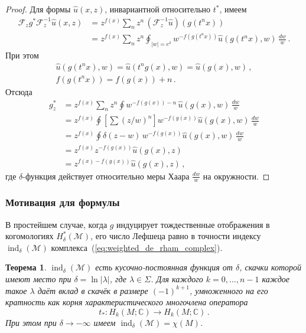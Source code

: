 \documentclass[a4paper, 12pt]{article}
\newtheorem{theorem}{Теорема}[section]
\theoremstyle{definition}
\begin{document}
\begin{proof}
    Для формы $\hat{u}(x,z)$, инвариантной относительно $t^*$, имеем \[
        \begin{aligned}
            \mathcal{F}_z g^* \mathcal{F}_z^{-1} \hat{u} (x,z)
&= z^{f(x)} \sum_{n} z^n \, (\mathcal{F}_z^{-1} \hat{u})(g(t^n x)) \\
&= z^{f(x)} \sum_{n} z^n \oint_{|w|=e^{\delta}} w^{-f(g(t^n x))} \hat{u}(g(t^n x), w) \, \frac{dw}{w}\,.
        \end{aligned}
    \]
    При этом \[
        \begin{gathered}
            \hat{u}(g(t^{n}x), w) = \hat{u}(t^{n}g(x), w) = \hat{u}(g(x), w)\,, \\
            f(g(t^{n}x)) = f(g(x)) + n\,.
        \end{gathered}
    \]
    Отсюда \[
        \begin{aligned}
            g^{*}_{z} 
        &= z^{f(x)} \sum_{n} z^n \oint w^{-f(g(x)) - n} \, \hat{u}(g(x), w) \, \frac{dw}{w} \\
        &= z^{f(x)} \oint \left[ \sum \left( z/w \right)^n \right] w^{-f(g(x))} \hat{u}(g(x), w) \,\frac{dw}{w} \\
        &= z^{f(x)} \oint \delta(z - w) \, w^{-f(g(x))} \hat{u}(g(x), w) \,\frac{dw}{w} \\
        &= z^{f(x)} z^{-f(g(x))} \hat{u}(g(x), z) \\
        &= z^{f(x) - f(g(x))} \hat{u}(g(x), z)\,,
        \end{aligned}
    \] где \({ \delta }\)-функция действует относительно меры Хаара \({ \frac{dw}{w} }\) на окружности.
\end{proof}

\subsubsection{Мотивация для формулы}

В простейшем случае, когда \({ g }\) индуцирует тождественные отображения в когомологиях \({ H^{*}_{\delta}(\mathcal M) }\), его число Лефшеца равно в точности индексу \({ \operatorname{ind}_{\delta}(\mathcal M) }\) комплекса~(\ref{eq:weighted_de_rham_complex}).

\begin{theorem}
    \({ \operatorname{ind}_{\delta}(\mathcal M) }\) есть кусочно-постоянная функция от \({ \delta }\), скачки которой имеют место при \({ \delta = \ln \lvert \lambda \rvert }\), где \({ \lambda \in \Sigma }\). Для каждого \({ k = 0, \ldots, n-1 }\) каждое такое \({ \lambda }\) даёт вклад в скачёк в размере \({ (-1)^{k+1} }\), умноженного на его кратность как корня характеристического многочлена оператора \[
        t_{*} : H_{k}(M; \mathbb C) \to H_{k}(M; \mathbb C)\,.
    \] При этом при \({ \delta \to -\infty }\) имеем \({ \operatorname{ind}_{\delta}(\mathcal M) = \chi(M) }\).
\end{theorem}
\end{document}
